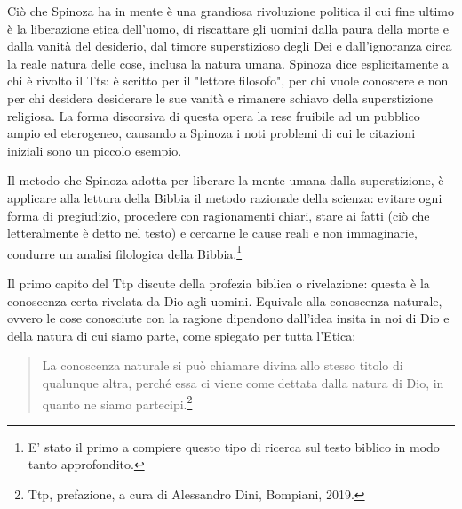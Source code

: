 Ciò che Spinoza ha in mente è
una grandiosa rivoluzione politica il cui fine ultimo è la liberazione etica dell'uomo, di riscattare gli uomini dalla paura
della morte e dalla vanità del desiderio, dal timore superstizioso degli Dei e dall'ignoranza circa la
reale natura delle cose, inclusa la natura umana. Spinoza dice esplicitamente a chi è rivolto il Tts: è scritto per il "lettore filosofo", per chi vuole conoscere e non per chi desidera desiderare le sue vanità e rimanere schiavo della superstizione religiosa. La forma  discorsiva di questa opera la rese fruibile ad un pubblico ampio ed eterogeneo, causando a Spinoza i noti problemi di cui le citazioni iniziali sono un piccolo esempio.

Il metodo che Spinoza adotta per liberare la mente umana dalla superstizione, è applicare alla lettura della Bibbia il metodo razionale
della scienza: evitare ogni forma di pregiudizio, procedere con ragionamenti chiari, stare ai fatti (ciò che
letteralmente è detto nel testo) e cercarne le cause reali e non immaginarie, condurre un analisi filologica della Bibbia.\footnote{E' stato il primo a compiere questo tipo di ricerca sul testo biblico in modo tanto approfondito.}

Il primo capito del Ttp discute della profezia biblica o rivelazione: questa è la conoscenza certa rivelata da Dio agli uomini. Equivale alla conoscenza naturale, ovvero le cose conosciute con la ragione dipendono dall'idea insita in noi di Dio e della natura di cui siamo parte, come spiegato per tutta l'Etica:

\begin{quotation}
	\small La conoscenza naturale si può
	chiamare divina allo stesso titolo di qualunque altra, perché essa ci viene come dettata dalla natura
	di Dio, in quanto ne siamo partecipi.\footnote{Ttp, prefazione, a cura di Alessandro Dini, Bompiani, 2019.}
\end{quotation}

